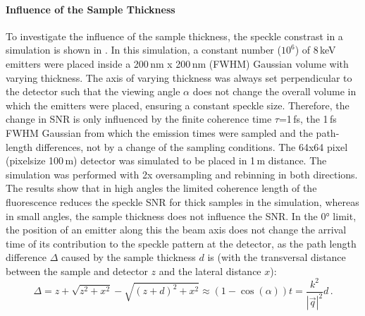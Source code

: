 \paragraph{Influence of the Sample Thickness}
To investigate the influence of the sample thickness, the speckle constrast in a simulation is shown in . In this simulation, a constant number ($10^6$) of 8\,keV emitters were placed inside a 200\,nm x 200\,nm (FWHM) Gaussian volume with varying thickness.  The axis of varying thickness was always set perpendicular to the detector such that the viewing angle $\alpha$ does not change the overall volume in which the emitters were placed, ensuring a constant speckle size. Therefore, the change in SNR is only influenced by the finite coherence time $\tau$=1\,fs, the 1\,fs FWHM Gaussian from which the emission times were sampled and the path-length differences, not by a change of the sampling conditions. The 64x64 pixel (pixelsize 100\,\textmu m) detector was simulated to be placed in 1\,m distance. The simulation was performed with 2x oversampling and rebinning in both directions.  
The results show that in high angles the limited coherence length of the fluorescence reduces the speckle SNR for thick samples in the simulation, whereas in small angles, the sample thickness does not influence the SNR. In the 0° limit, the position of an emitter along this the beam axis does not change the arrival time of its contribution to the speckle pattern at the detector, as the path length difference $\Delta$ caused by the sample thickness $d$ is (with the transversal distance between the sample and detector $z$ and the lateral distance $x$):
\begin{equation}
	\Delta=z+\sqrt{z^2+x^2}-\sqrt{(z+d)^2+x^2} \approx(1-\cos (\alpha)) t=\frac{k^2}{\left|\vec{q}\right|^2}d \,.
\end{equation}



